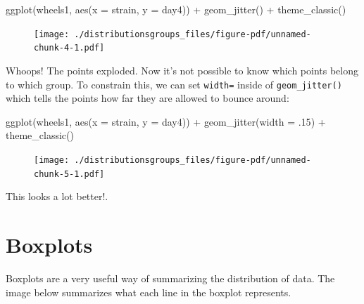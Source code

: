 \documentclass[
  letterpaper,
  DIV=11,
  numbers=noendperiod]{scrreprt}
\newenvironment{Shaded}{\begin{snugshade}}{\end{snugshade}}
\newcommand{\AttributeTok}[1]{\textcolor[rgb]{0.40,0.45,0.13}{#1}}
\newcommand{\DecValTok}[1]{\textcolor[rgb]{0.68,0.00,0.00}{#1}}
\newcommand{\FunctionTok}[1]{\textcolor[rgb]{0.28,0.35,0.67}{#1}}
\newcommand{\NormalTok}[1]{\textcolor[rgb]{0.00,0.23,0.31}{#1}}
\newcommand{\SpecialCharTok}[1]{\textcolor[rgb]{0.37,0.37,0.37}{#1}}
\begin{document}
\begin{Shaded}
\begin{Highlighting}[]
\FunctionTok{ggplot}\NormalTok{(wheels1, }\FunctionTok{aes}\NormalTok{(}\AttributeTok{x =}\NormalTok{ strain, }\AttributeTok{y =}\NormalTok{ day4)) }\SpecialCharTok{+} 
  \FunctionTok{geom\_jitter}\NormalTok{()  }\SpecialCharTok{+}
  \FunctionTok{theme\_classic}\NormalTok{()}
\end{Highlighting}
\end{Shaded}

\begin{figure}[H]

{\centering \texttt{[image: ./distributionsgroups\_files/figure-pdf/unnamed-chunk-4-1.pdf]}

}

\end{figure}

Whoops! The points exploded. Now it's not possible to know which points
belong to which group. To constrain this, we can set \texttt{width=}
inside of \texttt{geom\_jitter()} which tells the points how far they
are allowed to bounce around:

\begin{Shaded}
\begin{Highlighting}[]
\FunctionTok{ggplot}\NormalTok{(wheels1, }\FunctionTok{aes}\NormalTok{(}\AttributeTok{x =}\NormalTok{ strain, }\AttributeTok{y =}\NormalTok{ day4)) }\SpecialCharTok{+} 
  \FunctionTok{geom\_jitter}\NormalTok{(}\AttributeTok{width =}\NormalTok{ .}\DecValTok{15}\NormalTok{)  }\SpecialCharTok{+}
  \FunctionTok{theme\_classic}\NormalTok{()}
\end{Highlighting}
\end{Shaded}

\begin{figure}[H]

{\centering \texttt{[image: ./distributionsgroups\_files/figure-pdf/unnamed-chunk-5-1.pdf]}

}

\end{figure}

This looks a lot better!.

\hypertarget{boxplots}{%
\section{Boxplots}\label{boxplots}}

Boxplots are a very useful way of summarizing the distribution of data.
The image below summarizes what each line in the boxplot represents.
\end{document}
